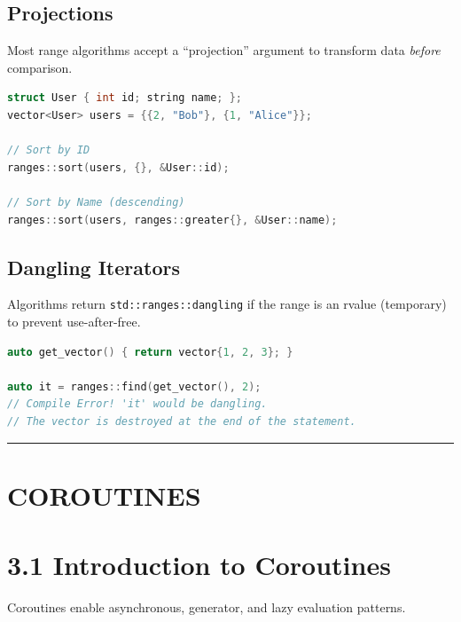 \hypertarget{projections}{%
\subsection{Projections}\label{projections}}

Most range algorithms accept a ``projection'' argument to transform data
\emph{before} comparison.

\begin{lstlisting}[language={C++}]
struct User { int id; string name; };
vector<User> users = {{2, "Bob"}, {1, "Alice"}};

// Sort by ID
ranges::sort(users, {}, &User::id);

// Sort by Name (descending)
ranges::sort(users, ranges::greater{}, &User::name);
\end{lstlisting}

\hypertarget{dangling-iterators}{%
\subsection{Dangling Iterators}\label{dangling-iterators}}

Algorithms return \passthrough{\lstinline!std::ranges::dangling!} if the
range is an rvalue (temporary) to prevent use-after-free.

\begin{lstlisting}[language={C++}]
auto get_vector() { return vector{1, 2, 3}; }

auto it = ranges::find(get_vector(), 2); 
// Compile Error! 'it' would be dangling.
// The vector is destroyed at the end of the statement.
\end{lstlisting}

\begin{center}\rule{0.5\linewidth}{0.5pt}\end{center}

\hypertarget{coroutines}{%
\section{COROUTINES}\label{coroutines}}

\hypertarget{introduction-to-coroutines}{%
\section{3.1 Introduction to
Coroutines}\label{introduction-to-coroutines}}

Coroutines enable asynchronous, generator, and lazy evaluation patterns.

